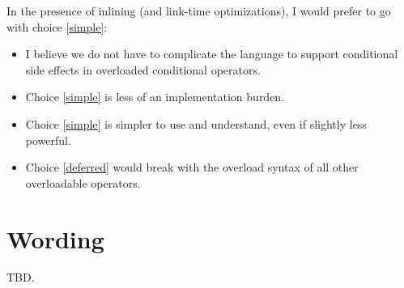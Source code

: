 In the presence of inlining (and link-time optimizations), I would prefer to go with choice \ref{simple}:
\begin{itemize}
  \item I believe we do not have to complicate the language to support conditional side effects in overloaded conditional operators.
  \item Choice \ref{simple} is less of an implementation burden.
  \item Choice \ref{simple} is simpler to use and understand, even if slightly less powerful.
  \item Choice \ref{deferred} would break with the overload syntax of all other overloadable operators.
\end{itemize}

\section{Wording}
TBD.


